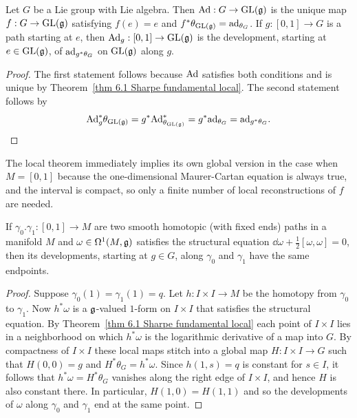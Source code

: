 \begin{cor}\label{cor 5.3 Sharpe}
    Let $G$ be a Lie group with Lie algebra. Then $\mathrm{Ad}:G\to \operatorname{GL}(\mathfrak{g})$ is the unique map $f:G\to \operatorname{GL}(\mathfrak{g})$ satisfying $f(e)=e$ and $f^\ast\theta_{\operatorname{GL}(\mathfrak{g})}=\mathrm{ad}_{\theta_G}$. If $g:[0,1]\to G$ is a path starting at $e$, then $\mathrm{Ad}_g:[0,1]\to \operatorname{GL}(\mathfrak{g})$ is the development, starting at $e\in\operatorname{GL}(\mathfrak{g})$, of $\mathrm{ad}_{g^\ast\theta_G}$ on $\operatorname{GL}(\mathfrak{g})$ along $g$.
\end{cor}
\begin{proof}
    The first statement follows because $\mathrm{Ad}$ satisfies both conditions and is unique by Theorem~\ref{thm 6.1 Sharpe fundamental local}. The second statement follows by
    \[\mathrm{Ad}_g^\ast \theta_{\operatorname{GL}(\mathfrak{g})}=g^\ast\mathrm{Ad}^\ast_{\theta_{\operatorname{GL}(\mathfrak{g})}}=g^\ast\mathrm{ad}_{\theta_G}=\mathrm{ad}_{g^\ast\theta_G}.\]
\end{proof}

The local theorem immediately implies its own global version in the case when $M=[0,1]$ because the one-dimensional Maurer-Cartan equation is always true, and the interval is compact, so only a finite number of local reconstructions of $f$ are needed.

\begin{thm}\label{thm 7.7 Sharpe}
    If $\gamma_0.\gamma_1:[0,1]\to M$ are two smooth homotopic (with fixed ends) paths in a manifold $M$ and $\omega\in \Omega^1(M,\mathfrak{g})$ satisfies the structural equation $\dd \omega+\frac 12[\omega,\omega]=0$, then its developments, starting at $g\in G$, along $\gamma_0$ and $\gamma_1$ have the same endpoints.
\end{thm}
\begin{proof}
    Suppose $\gamma_0(1)=\gamma_1(1)=q$. Let $h:I\times I\to M$ be the homotopy from $\gamma_0$ to $\gamma_1$. Now $h^\ast\omega$ is a $\mathfrak{g}$-valued $1$-form on $I\times I$ that satisfies the structural equation.  By Theorem~\ref{thm 6.1 Sharpe fundamental local} each point of $I\times I$ lies in a neighborhood on which $h^\ast\omega$ is the logarithmic derivative of a map into $G$. By compactness of $I\times I$ these local maps stitch into a global map $H:I\times I\to G$ such that $H(0,0)=g$ and $H^\ast\theta_G=h^\ast\omega$. Since $h(1,s)=q$ is constant for $s\in I$, it follows that $h^\ast\omega=H^\ast\theta_G$ vanishes along the right edge of $I\times I$, and hence $H$ is also constant there. In particular, $H(1,0)=H(1,1)$ and so the developments of $\omega$ along $\gamma_0$ and $\gamma_1$ end at the same point.
\end{proof}

